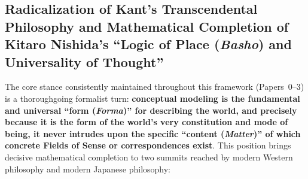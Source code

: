 \documentclass[11pt,a4paper]{article}
\theoremstyle{definition}
\theoremstyle{plain}
\theoremstyle{remark}
\begin{document}
\subsection{Radicalization of Kant's Transcendental Philosophy and Mathematical Completion of Kitaro Nishida's ``Logic of Place (\emph{Basho}) and Universality of Thought''}
The core stance consistently maintained throughout this framework (Papers~0--3) is a thoroughgoing formalist turn: \textbf{conceptual modeling is the fundamental and universal ``form (\emph{Forma})'' for describing the world, and precisely because it is the form of the world's very constitution and mode of being, it never intrudes upon the specific ``content (\emph{Matter})'' of which concrete Fields of Sense or correspondences exist}. This position brings decisive mathematical completion to two summits reached by modern Western philosophy and modern Japanese philosophy:
\end{document}
